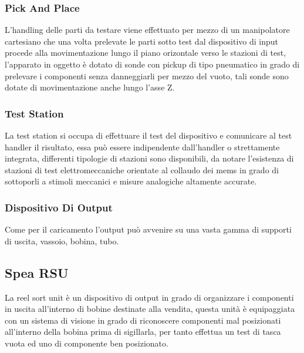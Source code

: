 \subsubsection{Pick And Place}

L’handling delle parti da testare viene effettuato per mezzo di un manipolatore cartesiano che una volta 
prelevate le parti sotto test dal dispositivo di input procede alla movimentazione lungo il piano orizontale verso le stazioni di test, l’apparato in oggetto è dotato di sonde con pickup di tipo pneumatico in grado di prelevare i componenti senza danneggiarli per mezzo del vuoto, tali sonde sono dotate di 
movimentazione anche lungo l’asse Z.  

\subsubsection{Test Station} 

La test station si occupa di effettuare il test del dispositivo e comunicare al test handler il risultato, essa può essere indipendente dall’handler o strettamente integrata, differenti tipologie di stazioni sono 
disponibili, da notare l’esistenza di stazioni di test elettromeccaniche orientate al collaudo dei mems in 
grado di sottoporli a stimoli meccanici e misure analogiche altamente accurate.  

\subsubsection{Dispositivo Di Output} 

Come per il caricamento l’output può avvenire su una vasta gamma di supporti di uscita, vassoio, bobina, 
tubo. 

\subsection{Spea RSU} 

La reel sort unit è un dispositivo di output in grado di organizzare i componenti in uscita all’interno di 
bobine destinate alla vendita, questa unità è equipaggiata con un sistema di visione in grado di 
riconoscere componenti mal posizionati all’interno della bobina prima di sigillarla, per  tanto effettua un 
test di tasca vuota ed uno di componente ben posizionato. 


\endinput